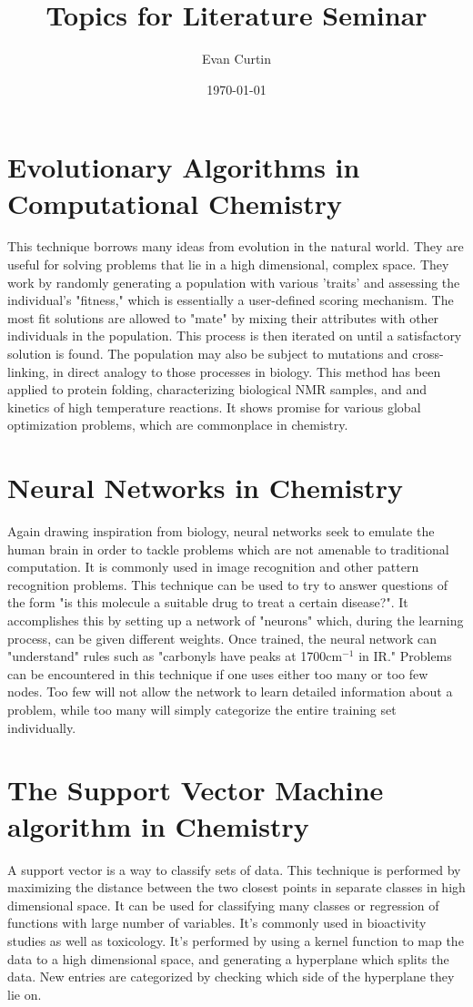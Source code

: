 \documentclass{revtex4}
\begin{document}
\title{Topics for Literature Seminar}
\author{Evan Curtin}
\date{\today}
\maketitle


\section{Evolutionary Algorithms in Computational Chemistry}
This technique borrows many ideas from evolution in the natural world. They are useful for solving problems that lie in a high dimensional, complex space. They work by randomly generating a population with various 'traits' and assessing the individual's "fitness," which is essentially a user-defined scoring mechanism. The most fit solutions are allowed to "mate" by mixing their attributes with other individuals in the population. This process is then iterated on until a satisfactory solution is found. The population may also be subject to mutations and cross-linking, in direct analogy to those processes in biology. This method has been applied to protein folding, characterizing biological NMR samples, and and kinetics of high temperature reactions. It shows promise for various global optimization problems, which are commonplace in chemistry. 

\section{Neural Networks in Chemistry}
Again drawing inspiration from biology, neural networks seek to emulate the human brain in order to tackle problems which are not amenable to traditional computation. It is commonly used in image recognition and other pattern recognition problems. This technique can be used to try to answer questions of the form "is this molecule a suitable drug to treat a certain disease?". It accomplishes this by setting up a network of "neurons" which, during the learning process, can be given different weights. Once trained, the neural network can "understand" rules such as "carbonyls have peaks at 1700cm$^{-1}$ in IR." Problems can be encountered in this technique if one uses either too many or too few nodes. Too few will not allow the network to learn detailed information about a problem, while too many will simply categorize the entire training set individually. 

\section{The Support Vector Machine algorithm in Chemistry}
A support vector is a way to classify sets of data. This technique is performed by maximizing the distance between the two closest points in separate classes in high dimensional space. It can be used for classifying many classes or regression of functions with large number of variables. It's commonly used in bioactivity studies as well as toxicology. It's performed by using a kernel function to map the data to a high dimensional space, and generating a hyperplane which splits the data. New entries are categorized by checking which side of the hyperplane they lie on. 
\end{document}
